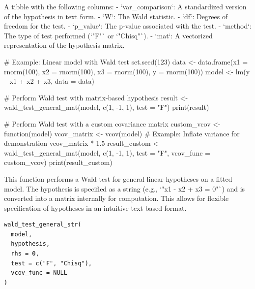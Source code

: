 \documentclass[a4paper]{book}
\begin{document}
%
\begin{Value}
A tibble with the following columns:
- `var\_comparison`: A standardized version of the hypothesis in text form.
- `W`: The Wald statistic.
- `df`: Degrees of freedom for the test.
- `p\_value`: The p-value associated with the test.
- `method`: The type of test performed (`"F"` or `"Chisq"`).
- `mat`: A vectorized representation of the hypothesis matrix.
\end{Value}
%
\begin{Examples}
\begin{ExampleCode}
# Example: Linear model with Wald test
set.seed(123)
data <- data.frame(x1 = rnorm(100), x2 = rnorm(100), x3 = rnorm(100), y = rnorm(100))
model <- lm(y ~ x1 + x2 + x3, data = data)

# Perform Wald test with matrix-based hypothesis
result <- wald_test_general_mat(model, c(1, -1, 1), test = "F")
print(result)

# Perform Wald test with a custom covariance matrix
custom_vcov <- function(model) {
  vcov_matrix <- vcov(model)
  # Example: Inflate variance for demonstration
  vcov_matrix * 1.5
}
result_custom <- wald_test_general_mat(model, c(1, -1, 1), test = "F", vcov_func = custom_vcov)
print(result_custom)

\end{ExampleCode}
\end{Examples}
%
\begin{Description}
This function performs a Wald test for general linear hypotheses on a fitted model.
The hypothesis is specified as a string (e.g., `"x1 - x2 + x3 = 0"`) and is converted
into a matrix internally for computation. This allows for flexible specification of
hypotheses in an intuitive text-based format.
\end{Description}
%
\begin{Usage}
\begin{verbatim}
wald_test_general_str(
  model,
  hypothesis,
  rhs = 0,
  test = c("F", "Chisq"),
  vcov_func = NULL
)
\end{verbatim}
\end{Usage}
%
\end{document}
